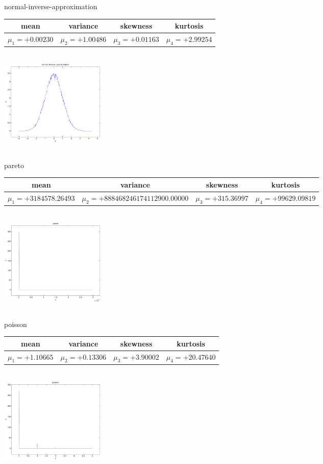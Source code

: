 \documentclass[9pt]{article}
\theoremstyle{plain}
\theoremstyle{definition}
\theoremstyle{remark}
\numberwithin{equation}{section}
\begin{document}
\newpage
normal-inverse-approximation \begin{tabular}{|c|c|c|c|}  mean & variance & skewness & kurtosis \\  \hline
$\mu_1 = +0.00230$ & $\mu_2 = +1.00486$ & $\mu_3 = +0.01163$ & $\mu_4 =+2.99254$ \\
\end{tabular}

\includegraphics[width=5cm,height=5cm]{normal-inverse-approximation.pdf}

pareto \begin{tabular}{|c|c|c|c|}  mean & variance & skewness & kurtosis \\  \hline
$\mu_1 = +3184578.26493$ & $\mu_2 = +888468246174112900.00000$ & $\mu_3 = +315.36997$ & $\mu_4 =+99629.09819$ \\
\end{tabular}

\includegraphics[width=5cm,height=5cm]{pareto.pdf}

poisson \begin{tabular}{|c|c|c|c|}  mean & variance & skewness & kurtosis \\  \hline
$\mu_1 = +1.10665$ & $\mu_2 = +0.13306$ & $\mu_3 = +3.90002$ & $\mu_4 =+20.47640$ \\
\end{tabular}

\includegraphics[width=5cm,height=5cm]{poisson.pdf}
\end{document}
